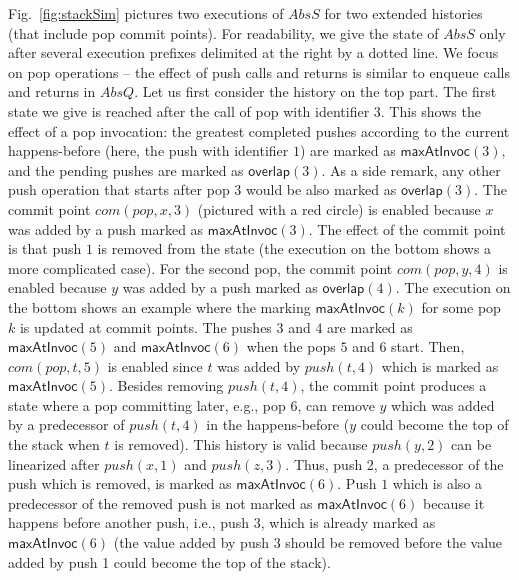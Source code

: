 Fig.~\ref{fig:stackSim} pictures two executions of $AbsS$ for two extended histories (that include pop commit points). For readability, we give the state of $AbsS$ only after several execution prefixes delimited at the right by a dotted line. We focus on pop operations -- the effect of push calls and returns is similar to enqueue calls and returns in $AbsQ$. Let us first consider the history on the top part. The first state we give is reached after the call of pop with identifier $3$. This shows the effect of a pop invocation: the greatest completed pushes according to the current happens-before (here, the push with identifier $1$) are marked as $\mathsf{maxAtInvoc}(3)$, and the pending pushes are marked as $\mathsf{overlap}(3)$. As a side remark, any other push operation that starts after pop $3$ would be also marked as $\mathsf{overlap}(3)$.
The commit point $com(pop,x,3)$ (pictured with a red circle) is enabled because $x$ was added by a push marked as $\mathsf{maxAtInvoc}(3)$. The effect of the commit point is that push $1$ is removed from the state (the execution on the bottom shows a more complicated case). For the second pop, the commit point $com(pop,y,4)$ is enabled because $y$ was added by a push marked as $\mathsf{overlap}(4)$. The execution on the bottom shows an example where the marking $\mathsf{maxAtInvoc}(k)$ for some pop $k$ is updated at commit points. The pushes $3$ and $4$ are marked as $\mathsf{maxAtInvoc}(5)$ and $\mathsf{maxAtInvoc}(6)$
when the pops $5$ and $6$ start. Then, $com(pop,t,5)$ is enabled since $t$ was added by $push(t,4)$ which is marked as $\mathsf{maxAtInvoc}(5)$. Besides removing $push(t,4)$, the commit point produces a state where a pop committing later, e.g., pop $6$, can remove $y$ which was added by a predecessor of $push(t,4)$ in the happens-before ($y$ could become the top of the stack when $t$ is removed). This history is valid because $push(y,2)$ can be linearized after $push(x,1)$ and $push(z,3)$. Thus, push 2, a predecessor of the push which is removed, is marked as $\mathsf{maxAtInvoc}(6)$. Push $1$ which is also a predecessor of the removed push is not marked as $\mathsf{maxAtInvoc}(6)$ because it happens before another push, i.e., push 3, which is already marked as $\mathsf{maxAtInvoc}(6)$ (the value added by push 3 should be removed before the value added by push 1 could become the top of the stack).

